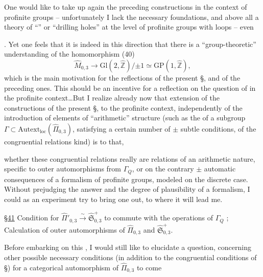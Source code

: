 One would like to take up again the
preceding constructions in the context
of profinite groups -- unfortunately
I lack the necessary foundations,
and above all a theory of ``''
or ``drilling holes'' at the level of profinite
groups with loops -- even    

. Yet one feels that it is
indeed in this direction that there is
a ``group-theoretic'' understanding
of the homomorphism  (40)
\[
\widehat{M}_{0,3}\longrightarrow
\mathrm{Gl}(2,\widehat{\mathbb Z})/\mathord{\pm}1
\simeq\mathrm{GP}(1,\widehat{\mathbb Z}),
\]
which is the main motivation for the
reflections of the present \S, and of the preceding ones.
This should be an incentive for a
 reflection on the question of
 in the profinite context\ldots But
I realize already now
that   extension of the constructions of
the present \S, to the profinite context, independently
of the introduction of elements
of ``arithmetic'' structure (such as
the \uline{} of a subgroup
$\Gamma\subset\mathrm{Autext}_{\mathrm{loc}}(\widehat{\Pi}_{0,3})$,
satisfying a certain number of
$\pm$ subtle conditions, of the congruential
relations kind) is  to that,


whether these congruential relations really are
relations of an arithmetic nature,
specific to outer automorphisms 
from $\Gamma_Q$, or on the contrary
$\pm$ automatic consequences of a
 formalism of profinite groups,  modeled
on the discrete case. Without prejudging 
the answer and the degree of
plausibility of  a formalism, I
could as an experiment try
to bring one out, to  where it
will lead me.

\uline{\S 41} Condition for
$\widehat{\Pi}'_{0,3}\xrightarrow{\sim}\widehat{\mathfrak S}_{0,3}^{+}$
to commute with the operations of $\Gamma_Q$ ; Calculation of outer
automorphisms of $\widehat{\Pi}_{0,3}$ and $\widehat{\mathfrak S}_{0,3}^{+}$.

Before embarking on this
, I would still like to elucidate
a question, concerning other
possible necessary conditions (in addition
to the congruential conditions of \S{})
for a categorical automorphism of $\widehat{\Pi}_{0,3}$ to come

